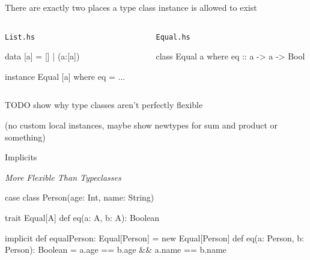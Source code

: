 \documentclass[usenames,dvipsnames,svgnames,table,aspectratio=169,mathserif]{beamer}
\newcommand{\nl}{\vspace{\baselineskip}}
\newcommand{\pnl}{\pause \nl}
\begin{document}
\begin{frame}[fragile]

There are exactly two places a type class instance is allowed to exist

\nl

\begin{columns}
\begin{column}[T]{0.49\textwidth}
\begin{block}{\tt List.hs}
\begin{haskellcode}
data [a] = []
         | (a:[a])

instance Equal [a] where
  eq = ...
\end{haskellcode}
\end{block}
\end{column}
\begin{column}{0.02\textwidth}
\end{column}
\begin{column}[T]{0.49\textwidth}
\begin{block}{\tt Equal.hs}
\begin{haskellcode}
class Equal a where
  eq :: a -> a -> Bool
\end{haskellcode}
\end{block}
\end{column}
\end{columns}

\end{frame}


\begin{frame}
TODO show why type classes aren't perfectly flexible

(no custom local instances, maybe show newtypes for sum and product or something)
\end{frame}



\begin{frame}
\begin{center}
\Huge{Implicits}

\nl

\large{{\it More Flexible Than Typeclasses}\texttrademark}
\end{center}
\end{frame}


\begin{frame}[fragile]
\begin{scalacode}
case class Person(age: Int, name: String)
\end{scalacode}

\pnl

\begin{scalacode}
trait Equal[A] {
  def eq(a: A, b: A): Boolean
}
\end{scalacode}

\pnl

\begin{scalacode}
implicit def equalPerson: Equal[Person] = new Equal[Person] {
  def eq(a: Person, b: Person): Boolean =
    a.age == b.age && a.name == b.name
}
\end{scalacode}
\end{frame}
\end{document}
